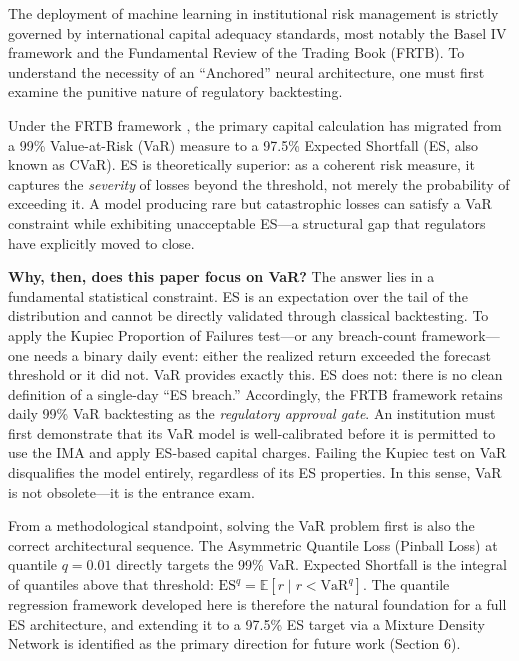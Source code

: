 
The deployment of machine learning in institutional risk management is strictly governed by international capital adequacy standards, most notably the Basel IV framework and the Fundamental Review of the Trading Book (FRTB). To understand the necessity of an ``Anchored'' neural architecture, one must first examine the punitive nature of regulatory backtesting.

Under the FRTB framework \cite{bcbs2019frtb}, the primary capital calculation has migrated from a 99\% Value-at-Risk (VaR) measure to a 97.5\% Expected Shortfall (ES, also known as CVaR). ES is theoretically superior: as a coherent risk measure, it captures the \emph{severity} of losses beyond the threshold, not merely the probability of exceeding it. A model producing rare but catastrophic losses can satisfy a VaR constraint while exhibiting unacceptable ES---a structural gap that regulators have explicitly moved to close.

\textbf{Why, then, does this paper focus on VaR?} The answer lies in a fundamental statistical constraint. ES is an expectation over the tail of the distribution and cannot be directly validated through classical backtesting. To apply the Kupiec Proportion of Failures test---or any breach-count framework---one needs a binary daily event: either the realized return exceeded the forecast threshold or it did not. VaR provides exactly this. ES does not: there is no clean definition of a single-day ``ES breach.'' Accordingly, the FRTB framework retains daily 99\% VaR backtesting as the \emph{regulatory approval gate}. An institution must first demonstrate that its VaR model is well-calibrated before it is permitted to use the IMA and apply ES-based capital charges. Failing the Kupiec test on VaR disqualifies the model entirely, regardless of its ES properties. In this sense, VaR is not obsolete---it is the entrance exam.

From a methodological standpoint, solving the VaR problem first is also the correct architectural sequence. The Asymmetric Quantile Loss (Pinball Loss) at quantile $q = 0.01$ directly targets the 99\% VaR. Expected Shortfall is the integral of quantiles above that threshold: $\text{ES}^q = \mathbb{E}[r \mid r < \text{VaR}^q]$. The quantile regression framework developed here is therefore the natural foundation for a full ES architecture, and extending it to a 97.5\% ES target via a Mixture Density Network is identified as the primary direction for future work (Section 6).

